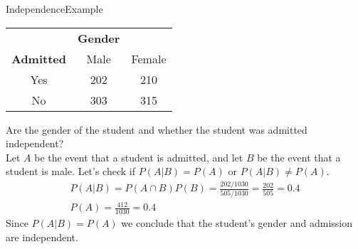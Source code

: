 \documentclass[xcolor=dvipsnames]{beamer}
\begin{document}
\begin{frame}{Independence}{Example}
\begin{center}
	\begin{tabular}{c|cc}
		& \textbf{Gender} & \\
		\textbf{Admitted} & Male & Female \\ \hline
		Yes & 202 & 210 \\
		No & 303 & 315
	\end{tabular}
\end{center}
Are the gender of the student and whether the student was admitted independent? \\ 
Let $A$ be the event that a student is admitted, and let $B$ be the event that a student is male. Let's check if $P(A|B) = P(A)$ or $P(A|B) \neq P(A)$.
\begin{gather*}
	P(A|B) = P(A \cap B) P(B) = \frac{202/1030}{505/1030}= \frac{202}{505} = 0.4 \\
	P(A) = \frac{412}{1030} = 0.4
\end{gather*}
Since $P(A|B) = P(A)$ we conclude that the student's gender and admission are independent. 
\end{frame}
\end{document}
